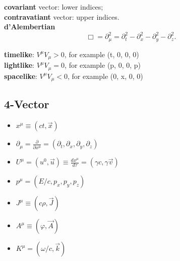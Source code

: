 \textbf{covariant} vector: lower indices;    \\
\textbf{contravatiant} vector: upper indices.	\\
\textbf{d'Alembertian} 
\begin{equation}
    \label{eqn:d'Alembertian}
    \Box = \partial^2_\mu = \partial_t^2-\partial_x^2-\partial_y^2-\partial_z^2.
\end{equation}

\textbf{timelike}:  $V^\mu V_\mu > 0$, for example (t, 0, 0, 0)	\\
\textbf{lightlike}:  $V^\mu V_\mu = 0$, for example (p, 0, 0, p)	\\
\textbf{spacelike}:  $V^\mu V_\mu < 0$, for example (0, x, 0, 0)
\subsection{4-Vector}
\begin{itemize}
    \item $x^\mu \equiv (ct, \vec{x})$
    \item $\partial_\mu = \frac{\partial}{\partial x^\mu} = (\partial_t, \partial_x, \partial_y, \partial_z)$
    \item $U^\mu = (u^0, \vec{u}) \equiv \frac{dx^\mu}{d\tau} = (\gamma c, \gamma\vec{v})$
    \item $p^\mu = (E/c, p_x, p_y, p_z)$
    \item $J^\mu \equiv (c\rho, \vec{J})$
    \item $A^{\mu} \equiv (\varphi, \vec{A})$
    \item $K^\mu = (\omega/c, \vec{k})$
\end{itemize}



